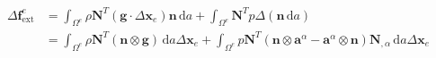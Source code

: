 \documentclass[../main.tex]{subfiles}
\begin{document}
\begin{equation}\label{eq:del_f_ext_dead_2}
    \begin{split}
        \Delta \mathbf{f}_{\mathrm{ext}}^{e} &= \int_{\Omega^{e}} \rho \mathbf{N}^{T} \left( \boldsymbol{g} \cdot \Delta \mathbf{x}_{e} \right) \boldsymbol{n} \, \mathrm{d} a + \int_{\Omega^{e}} \mathbf{N}^{T} p \Delta \left( \boldsymbol{n} \, \mathrm{d} a \right) \\ &= \int_{\Omega^{e}} \rho \mathbf{N}^{T} \left( \boldsymbol{n} \otimes \boldsymbol{g} \right) \, \mathrm{d} a \Delta \mathbf{x}_{e} + \int_{\Omega^{e}} p \mathbf{N}^{T} \left( \boldsymbol{n} \otimes \boldsymbol{a}^{\alpha} - \boldsymbol{a}^{\alpha} \otimes \boldsymbol{n} \right) \mathbf{N}_{, \alpha} \, \mathrm{d} a \Delta \mathbf{x}_{e}
    \end{split}
\end{equation}
\end{document}
